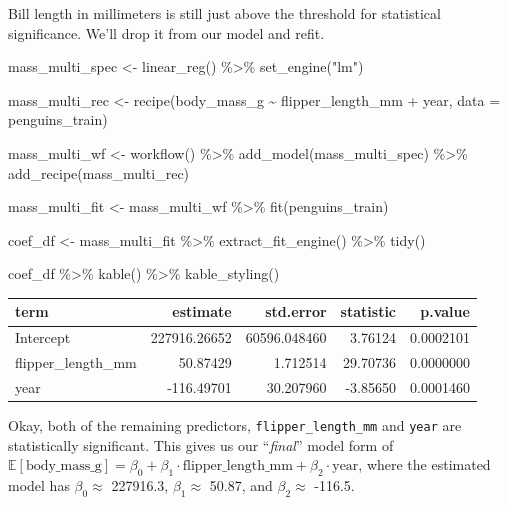 \documentclass[
  letterpaper,
  DIV=11,
  numbers=noendperiod]{scrartcl}
\newenvironment{Shaded}{\begin{snugshade}}{\end{snugshade}}
\newcommand{\AttributeTok}[1]{\textcolor[rgb]{0.40,0.45,0.13}{#1}}
\newcommand{\FunctionTok}[1]{\textcolor[rgb]{0.28,0.35,0.67}{#1}}
\newcommand{\NormalTok}[1]{\textcolor[rgb]{0.00,0.23,0.31}{#1}}
\newcommand{\OtherTok}[1]{\textcolor[rgb]{0.00,0.23,0.31}{#1}}
\newcommand{\SpecialCharTok}[1]{\textcolor[rgb]{0.37,0.37,0.37}{#1}}
\newcommand{\StringTok}[1]{\textcolor[rgb]{0.13,0.47,0.30}{#1}}
\begin{document}
Bill length in millimeters is still just above the threshold for
statistical significance. We'll drop it from our model and refit.

\begin{Shaded}
\begin{Highlighting}[]
\NormalTok{mass\_multi\_spec }\OtherTok{\textless{}{-}} \FunctionTok{linear\_reg}\NormalTok{() }\SpecialCharTok{\%\textgreater{}\%}
  \FunctionTok{set\_engine}\NormalTok{(}\StringTok{"lm"}\NormalTok{)}

\NormalTok{mass\_multi\_rec }\OtherTok{\textless{}{-}} \FunctionTok{recipe}\NormalTok{(body\_mass\_g }\SpecialCharTok{\textasciitilde{}}\NormalTok{ flipper\_length\_mm }\SpecialCharTok{+}\NormalTok{ year, }\AttributeTok{data =}\NormalTok{ penguins\_train)}

\NormalTok{mass\_multi\_wf }\OtherTok{\textless{}{-}} \FunctionTok{workflow}\NormalTok{() }\SpecialCharTok{\%\textgreater{}\%}
  \FunctionTok{add\_model}\NormalTok{(mass\_multi\_spec) }\SpecialCharTok{\%\textgreater{}\%}
  \FunctionTok{add\_recipe}\NormalTok{(mass\_multi\_rec)}

\NormalTok{mass\_multi\_fit }\OtherTok{\textless{}{-}}\NormalTok{ mass\_multi\_wf }\SpecialCharTok{\%\textgreater{}\%}
  \FunctionTok{fit}\NormalTok{(penguins\_train)}

\NormalTok{coef\_df }\OtherTok{\textless{}{-}}\NormalTok{ mass\_multi\_fit }\SpecialCharTok{\%\textgreater{}\%}
  \FunctionTok{extract\_fit\_engine}\NormalTok{() }\SpecialCharTok{\%\textgreater{}\%}
  \FunctionTok{tidy}\NormalTok{()}

\NormalTok{coef\_df }\SpecialCharTok{\%\textgreater{}\%}
  \FunctionTok{kable}\NormalTok{() }\SpecialCharTok{\%\textgreater{}\%}
  \FunctionTok{kable\_styling}\NormalTok{()}
\end{Highlighting}
\end{Shaded}

\begin{longtable}[t]{lrrrr}
\toprule
term & estimate & std.error & statistic & p.value\\
\midrule
Intercept & 227916.26652 & 60596.048460 & 3.76124 & 0.0002101\\
flipper\_length\_mm & 50.87429 & 1.712514 & 29.70736 & 0.0000000\\
year & -116.49701 & 30.207960 & -3.85650 & 0.0001460\\
\bottomrule
\end{longtable}

Okay, both of the remaining predictors, \texttt{flipper\_length\_mm} and
\texttt{year} are statistically significant. This gives us our
``\emph{final}'' model form of
\(\mathbb{E}\left[\text{body\_mass\_g}\right] = \beta_0 + \beta_1 \cdot\text{flipper\_length\_mm} + \beta_2\cdot\text{year}\),
where the estimated model has \(\beta_0\approx\) 227916.3,
\(\beta_1\approx\) 50.87, and \(\beta_2\approx\) -116.5.
\end{document}
